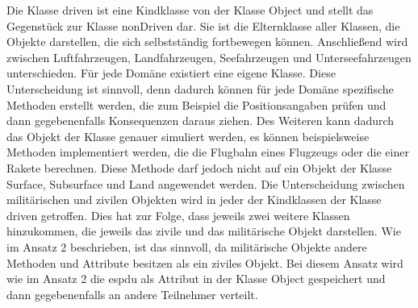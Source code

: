 Die Klasse \glqq driven\grqq{} ist eine Kindklasse von der Klasse  \glqq Object\grqq{} und stellt das Gegenstück zur Klasse \glqq nonDriven\grqq{} dar. Sie ist die Elternklasse aller Klassen, die Objekte darstellen, die sich selbstständig fortbewegen können. Anschließend  wird zwischen Luftfahrzeugen, Landfahrzeugen, Seefahrzeugen und Unterseefahrzeugen unterschieden. Für jede Domäne existiert eine eigene Klasse. Diese Unterscheidung ist sinnvoll, denn dadurch können für jede Domäne spezifische Methoden erstellt werden, die zum Beispiel die Positionsangaben prüfen und dann gegebenenfalls Konsequenzen daraus ziehen. Des Weiteren kann dadurch das Objekt der Klasse genauer simuliert werden, es können beispielsweise Methoden implementiert werden, die die Flugbahn eines Flugzeugs oder die einer Rakete berechnen. Diese Methode darf jedoch nicht auf ein Objekt der Klasse \glqq Surface\grqq{}, \glqq Subsurface\grqq{} und \glqq Land\grqq{} angewendet werden. Die  Unterscheidung  zwischen militärischen und zivilen Objekten wird in jeder der Kindklassen  der Klasse \glqq driven\grqq{} getroffen. Dies hat zur Folge, dass jeweils zwei weitere Klassen hinzukommen, die jeweils das zivile und das militärische Objekt darstellen. Wie im Ansatz 2 beschrieben, ist das sinnvoll, da militärische Objekte andere Methoden und Attribute besitzen als ein ziviles Objekt.
Bei diesem Ansatz wird wie im Ansatz 2 die \ac{espdu} als Attribut in der Klasse \glqq Object\grqq{} gespeichert und dann gegebenenfalls an andere Teilnehmer verteilt.\\
